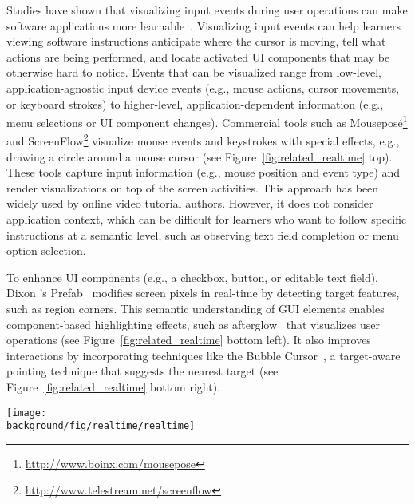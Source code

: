 Studies have shown that visualizing input events during user operations can make software applications more learnable~\cite{Dixon:2010fb}. Visualizing input events can help learners viewing software instructions anticipate where the cursor is moving, tell what actions are being performed, and locate activated UI components that may be otherwise hard to notice.
%
Events that can be visualized range from low-level, application-agnostic input device events (e.g., mouse actions, cursor movements, or keyboard strokes) to higher-level, application-dependent information (e.g., menu selections or UI component changes).
%
Commercial tools such as Mouseposé\footnote{\url{http://www.boinx.com/mousepose}} and ScreenFlow\footnote{\url{http://www.telestream.net/screenflow}} visualize mouse events and keystrokes with special effects, e.g., drawing a circle around a mouse cursor (see Figure~\ref{fig:related_realtime} top). These tools capture input information (e.g., mouse position and event type) and render visualizations on top of the screen activities. This approach has been widely used by online video tutorial authors. However, it does not consider application context, which can be difficult for learners who want to follow specific instructions at a semantic level, such as observing text field completion or menu option selection.

To enhance UI components (e.g., a checkbox, button, or editable text field), Dixon \ea{}'s Prefab~\cite{Dixon:2010fb,Dixon:2011:CHP:1978942.1979086} modifies screen pixels in real-time by detecting target features, such as region corners. This semantic understanding of GUI elements enables component-based highlighting effects, such as afterglow~\cite{Baudisch:2006:PET:1166253.1166280} that visualizes user operations (see Figure~\ref{fig:related_realtime} bottom left). It also improves interactions by incorporating techniques like the Bubble Cursor~\cite{Grossman:2005:BCE:1054972.1055012}, a target-aware pointing technique that suggests the nearest target (see Figure~\ref{fig:related_realtime} bottom right).

\begin{figure*}[t!]
  \centering
  \texttt{[image: \\background/fig/realtime/realtime]}
  \caption{Real-time visual enhancements to GUI applications. The top row shows how Mouseposé highlights a mouse cursor (left) and displays keyboard input (right); The bottom row shows how Prefab~\cite{Dixon:2010fb} can enable visualizations and UI enhancements such as target-agnostic afterglow effects~\cite{Baudisch:2006:PET:1166253.1166280} (left) and target-aware cursor effects~\cite{Grossman:2005:BCE:1054972.1055012} (right) by identifying and reverse engineering UI components.}
  \label{fig:related_realtime}
\end{figure*}

